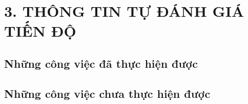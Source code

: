 \documentclass{article}
\begin{document}
	\section{3.	THÔNG TIN TỰ ĐÁNH GIÁ TIẾN ĐỘ}
	\subsection{Những công việc đã thực hiện được}
	
	\subsection{Những công việc chưa thực hiện được}
\end{document}
